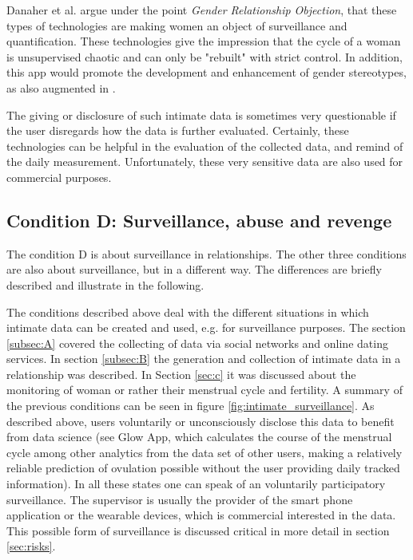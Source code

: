 Danaher et al. \cite{doi:10.1080/15265161.2017.1409823} argue under the point \textit{Gender Relationship Objection}, that these types of technologies are making women an object of surveillance and quantification. 
These technologies give the impression that the cycle of a woman is unsupervised chaotic and can only be "rebuilt" with strict control.
In addition, this app would promote the development and enhancement of gender stereotypes, as also augmented in \cite{doi:10.1080/13691058.2014.920528}.
 
The giving or disclosure of such intimate data is sometimes very questionable if the user disregards how the data is further evaluated. Certainly, these technologies can be helpful in the evaluation of the collected data, and remind of the daily measurement. Unfortunately, these very sensitive data are also used for commercial purposes.

\subsection{Condition D: Surveillance, abuse and revenge}
The condition D is about surveillance in relationships. The other three conditions are also about surveillance, but in a different way. The differences are briefly described and illustrate in the following.
 
The conditions described above deal with the different situations in which intimate data can be created and used, e.g. for surveillance purposes.
The section \ref{subsec:A} covered the collecting of data via social networks and online dating services. In section \ref{subsec:B} the generation and collection of intimate data in a relationship was described. In Section \ref{sec:c} it was discussed about the monitoring of woman or rather their menstrual cycle and fertility.
A summary of the previous conditions can be seen in figure \ref{fig:intimate_surveillance}.
As described above, users voluntarily or unconsciously disclose this data to benefit from data science (see Glow App, which calculates the course of the menstrual cycle among other analytics from the data set of other users, making a relatively reliable prediction of ovulation possible without the user providing daily tracked information).
In all these states one can speak of an voluntarily participatory surveillance.
The supervisor is usually the provider of the smart phone application or the wearable devices, which is commercial interested in the data. This possible form of surveillance is discussed critical in more detail in section \ref{sec:risks}.

